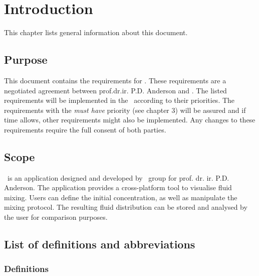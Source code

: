 \chapter{Introduction}
This chapter lists general information about this document.

\section{Purpose}
This document contains the requirements for \projectname. These requirements are a negotiated agreement between prof.dr.ir. P.D. Anderson and \projectauthor. The listed requirements will be implemented in the \applicationname\ according to their priorities. The requirements with the \emph{must have} priority (see chapter 3) will be assured and if time allows, other requirements might also be implemented. Any changes to these requirements require the full consent of both parties.

\section{Scope}
\projectname\ is an application designed and developed by \projectauthor\ group for prof. dr. ir. P.D. Anderson. The application provides a cross-platform tool to visualise fluid mixing. Users can define the initial concentration, as well as manipulate the mixing protocol. The resulting fluid distribution can be stored and analysed by the user for comparison purposes. \\


\section{List of definitions and abbreviations}
\subsection{Definitions}

